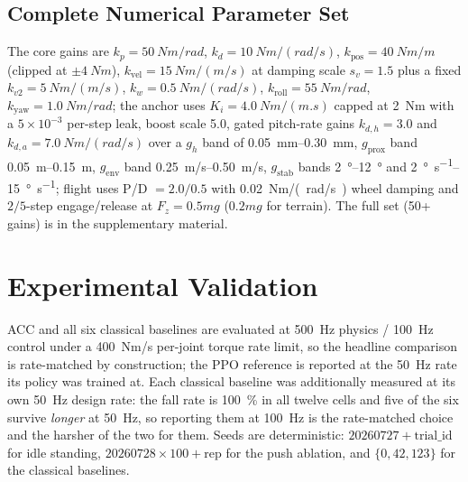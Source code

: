 \documentclass{jcd}
\begin{document}
\subsection{Complete Numerical Parameter Set}
\label{sec:parameters}

\begin{sloppypar}
The core gains are $k_p{=}\SI{50}{Nm/rad}$, $k_d{=}\SI{10}{Nm/(rad/s)}$,
$k_{\text{pos}}{=}\SI{40}{Nm/m}$ (clipped at $\pm\SI{4}{Nm}$),
$k_{\text{vel}}{=}\SI{15}{Nm/(m/s)}$ at damping scale $s_v{=}\num{1.5}$ plus a
fixed $k_{v2}{=}\SI{5}{Nm/(m/s)}$, $k_w{=}\SI{0.5}{Nm/(rad/s)}$,
$k_{\text{roll}}{=}\SI{55}{Nm/rad}$, $k_{\text{yaw}}{=}\SI{1.0}{Nm/rad}$; the
anchor uses $K_i{=}\SI{4.0}{Nm/(m.s)}$ capped at \SI{2}{Nm} with a
$5\times10^{-3}$ per-step leak, boost scale \num{5.0}, gated pitch-rate gains
$k_{d,h}{=}3.0$ and $k_{d,a}{=}\SI{7.0}{Nm/(rad/s)}$ over a $g_h$ band of
\SIrange{0.05}{0.30}{mm}, $g_{\text{prox}}$ band
\SIrange{0.05}{0.15}{m}, $g_{\text{env}}$ band \SIrange{0.25}{0.50}{m/s},
$g_{\text{stab}}$ bands \SIrange{2}{12}{\degree} and
\SIrange{2}{15}{\degree\per\second}; flight uses P/D $=2.0/0.5$ with
\SI{0.02}{Nm/(rad/s)} wheel damping and $2/5$-step engage/release at
$F_z{=}0.5mg$ ($0.2mg$ for terrain). The full set (50+ gains) is in the
supplementary material.
\end{sloppypar}

\section{Experimental Validation}
\label{sec:results}

ACC and all six classical baselines are evaluated at \SI{500}{Hz} physics /
\SI{100}{Hz} control under a \SI{400}{Nm/s} per-joint torque rate limit, so the
headline comparison is rate-matched by construction; the PPO reference is
reported at the \SI{50}{Hz} rate its policy was trained at. Each classical
baseline was additionally measured at its own \SI{50}{Hz} design rate: the fall
rate is \SI{100}{\percent} in all twelve cells and five of the six survive
\emph{longer} at \SI{50}{Hz}, so reporting them at \SI{100}{Hz} is the
rate-matched choice and the harsher of the two for them. Seeds are deterministic:
$20260727{+}\text{trial\_id}$ for idle standing,
$20260728{\times}100{+}\text{rep}$ for the push ablation, and $\{0,42,123\}$ for
the classical baselines.
\end{document}
